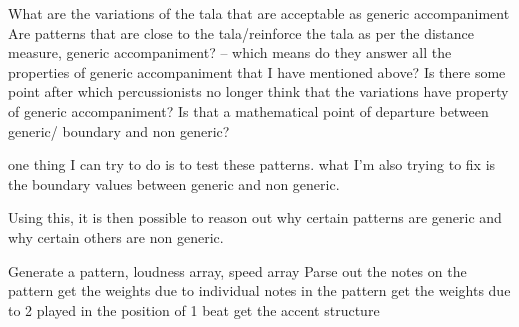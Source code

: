 What are the variations of the tala that are acceptable as generic accompaniment
Are patterns that are close to the tala/reinforce the tala as per the distance measure, generic accompaniment? -- which means do they answer all the properties  of generic accompaniment that I have mentioned above?
Is there some point after which percussionists no longer think that the variations have property of generic accompaniment?
Is that a mathematical point of departure between generic/ boundary and non generic?



one thing I can try to do is to test these patterns.
what I'm also trying to fix is the boundary values between generic and non generic. 

Using this, it is then possible to reason out why certain patterns are generic and why certain others
are non generic.

Generate a pattern, loudness array, speed array
Parse out the notes on the pattern
get the weights due to individual notes in the pattern
get the weights due to 2 played in the position of 1 beat
get the accent structure

